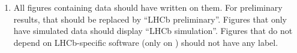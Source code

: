 \begin{enumerate}
\item All figures containing \lhcb data should have \lhcb written on
  them. For preliminary
  results, that should be replaced by ``LHCb preliminary''.
  Figures that only have simulated data should display ``LHCb simulation''.
  Figures that do not depend on LHCb-specific software (\eg only on \pythia)
  should not have any label.


\end{enumerate}
